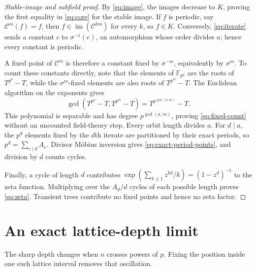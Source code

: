 \documentclass[10pt,a4paper]{amsart}
\theoremstyle{definition}
\theoremstyle{remark}
\newcommand{\F}{\mathbb F}
\newcommand{\im}{\operatorname{im}}
\begin{document}
\begin{proof}[Stable-image and subfield proof]
By \eqref{eq:image}, the images decrease to $K$, proving the first equality
in \eqref{eq:core} for the stable image.  If $f$ is periodic, say
$\mathcal C^m(f)=f$, then $f\in\im(\mathcal C^{km})$ for every $k$, so
$f\in K$.  Conversely, \eqref{eq:iterate} sends a constant $c$ to
$\sigma^{-1}(c)$, an automorphism whose order divides $a$; hence every
constant is periodic.

A fixed point of $\mathcal C^m$ is therefore a constant fixed by
$\sigma^{-m}$, equivalently by $\sigma^m$.  To count these constants
directly, note that the elements of $\F_{p^a}$ are the roots of
$T^{p^a}-T$, while the $\sigma^m$-fixed elements are also roots of
$T^{p^m}-T$.  The Euclidean algorithm on the exponents gives
\[
 \gcd\!\left(T^{p^a}-T,T^{p^m}-T\right)
   =T^{p^{\gcd(a,m)}}-T.
\]
This polynomial is separable and has degree $p^{\gcd(a,m)}$, proving
\eqref{eq:fixed-count} without an uncounted field-theory step.  Every orbit
length divides $a$.  For $d\mid a$,
the $p^d$ elements fixed by the $d$th iterate are partitioned by their exact
periods, so $p^d=\sum_{e\mid d}A_e$.  Divisor M\"obius inversion gives
\eqref{eq:exact-period-points}, and division by $d$ counts cycles.

Finally, a cycle of length $d$ contributes
$\exp(\sum_{k\ge1}z^{kd}/k)=(1-z^d)^{-1}$ to the zeta function.  Multiplying
over the $A_d/d$ cycles of each possible length proves \eqref{eq:zeta}.
Transient trees contribute no fixed points and hence no zeta factor.
\end{proof}

\section{An exact lattice-depth limit}
\label{sec:lattice}

The sharp depth changes when $n$ crosses powers of $p$.  Fixing the
position inside one such lattice interval removes that oscillation.
\end{document}
